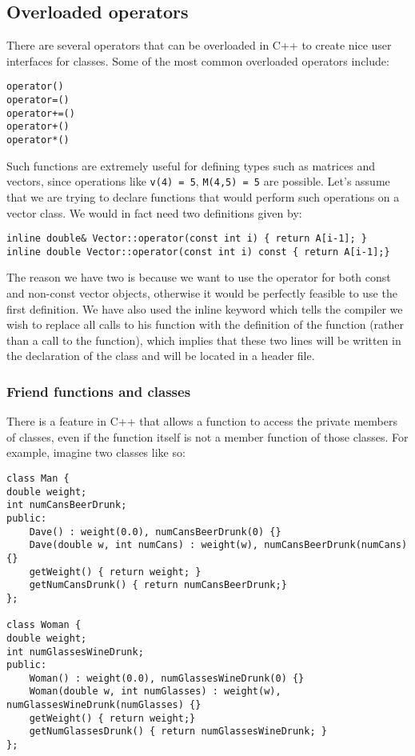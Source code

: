 \subsection{Overloaded operators}
There are several operators that can be overloaded in C++ to create nice user interfaces for classes. Some of the most common overloaded operators include:
\begin{lstlisting}
operator()
operator=()
operator+=()
operator+()
operator*()
\end{lstlisting}
Such functions are extremely useful for defining types such as matrices and vectors, since operations like \verb#v(4) = 5#, \verb#M(4,5) = 5#  are possible. Let's assume that we are trying to declare functions that would perform such operations on a vector class. We would in fact need two definitions given by:
\begin{lstlisting}
inline double& Vector::operator(const int i) { return A[i-1]; }
inline double Vector::operator(const int i) const { return A[i-1];} 
\end{lstlisting}
The reason we have two is because we want to use the operator for both const and non-const vector objects, otherwise it would be perfectly feasible to use the first definition. We have also used the inline keyword which tells the compiler we wish to replace all calls to his function with the definition of the function (rather than a call to the function), which implies that these two lines will be written in the declaration of the class and will be located in a header file.

\subsubsection{Friend functions and classes}

There is a feature in C++ that allows a function to access the private members of classes, even if the function itself is not a member function of those classes. For example, imagine two classes like so:
\begin{lstlisting}
class Man {
double weight;
int numCansBeerDrunk;
public:
	Dave() : weight(0.0), numCansBeerDrunk(0) {}
	Dave(double w, int numCans) : weight(w), numCansBeerDrunk(numCans) {}
	getWeight() { return weight; }
	getNumCansDrunk() { return numCansBeerDrunk;} 
};

class Woman {
double weight;
int numGlassesWineDrunk;
public:
	Woman() : weight(0.0), numGlassesWineDrunk(0) {}
	Woman(double w, int numGlasses) : weight(w), numGlassesWineDrunk(numGlasses) {}
	getWeight() { return weight;}
	getNumGlassesDrunk() { return numGlassesWineDrunk; }
};
\end{lstlisting}


